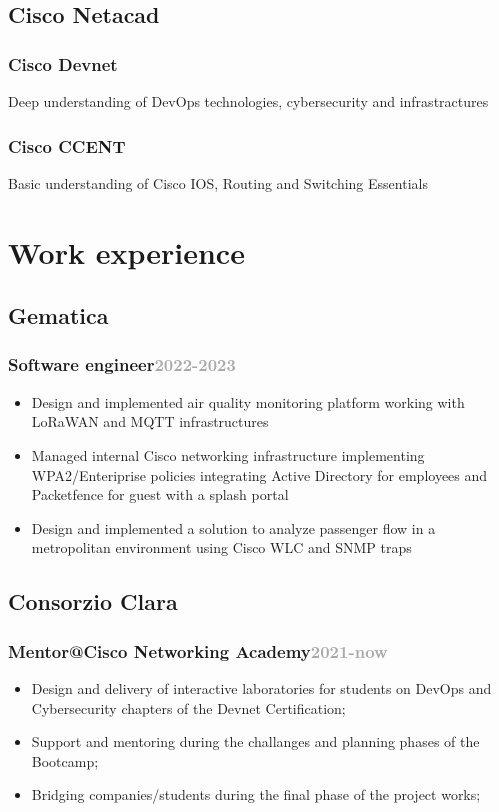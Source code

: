 \documentclass[11pt,a4paper]{article}
\begin{document}
  \subsection{Cisco Netacad}
  \subsubsection{Cisco Devnet} Deep understanding of DevOps technologies, cybersecurity and infrastractures
  \subsubsection{Cisco CCENT} Basic understanding of Cisco IOS, Routing and Switching Essentials

  \section*{Work experience}
  \subsection{Gematica}
  \subsubsection{Software engineer\hfill \textcolor{darkgray}{\small{2022-2023}}}
  \begin{itemize}
    \item Design and implemented air quality monitoring platform working with LoRaWAN and MQTT infrastructures
    \item Managed internal Cisco networking infrastructure implementing WPA2/Enteriprise policies integrating Active Directory for employees and Packetfence for guest with a splash portal
    \item Design and implemented a solution to analyze passenger flow in a metropolitan environment using Cisco WLC and SNMP traps
  \end{itemize}

  \subsection{Consorzio Clara}
  \subsubsection{Mentor@Cisco Networking Academy\hfill \textcolor{darkgray}{\small{2021-now}}}

  \begin{itemize}
    \item Design and delivery of interactive laboratories for students on DevOps and Cybersecurity chapters of the Devnet Certification;
    \item Support and mentoring during the challanges and planning phases of the Bootcamp;
    \item Bridging companies/students during the final phase of the project works;
  \end{itemize}
\end{document}
